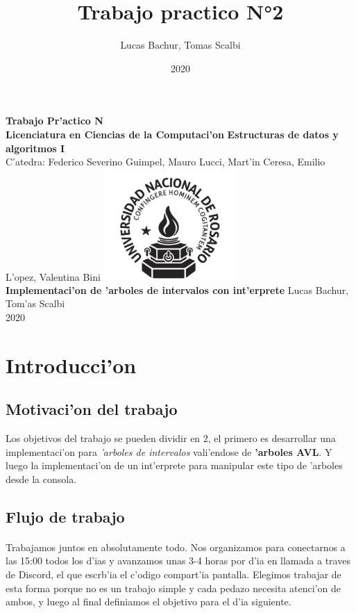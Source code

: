 \documentclass{article}
\title{Trabajo practico N°2}
\author{Lucas Bachur, Tomas Scalbi}
\date{2020}
\begin{document}
	
	\thispagestyle{empty} %
	\begin{center}
		\Huge
		\textbf{Trabajo Pr'actico N}\\
		\LARGE
		\vfill
		\textbf{Licenciatura en Ciencias de la Computaci'on}
		\vfill
		\textbf{Estructuras de datos y algoritmos I} \\
		C'atedra: Federico Severino Guimpel, Mauro Lucci, Mart'in Ceresa, Emilio L'opez, Valentina Bini
		\vfill
		\includegraphics[width=2in]{UNRlogo.png} \\
		\vfill
		\textbf{Implementaci'on de 'arboles de intervalos con int'erprete}
		\vfill
		Lucas Bachur, Tom'as Scalbi \\
		2020 \\
	\end{center}
	\pagebreak
	
	\tableofcontents
	\pagebreak
	
	
	\section{Introducci'on}
		\subsection{Motivaci'on del trabajo}
			Los objetivos del trabajo se pueden dividir en 2, el primero es desarrollar una implementaci'on para \emph{'arboles de intervalos} vali'endose de \textbf{'arboles AVL}.
			Y luego la implementaci'on de un int'erprete para manipular este tipo de 'arboles desde la consola.
			
		\subsection{Flujo de trabajo}
			\paragraph{}
			Trabajamos juntos en absolutamente todo. Nos organizamos para conectarnos a las 15:00 todos los d'ias y avanzamos unas 3-4 horas por d'ia en llamada a traves de Discord, el que escrb'ia el c'odigo compart'ia pantalla. Elegimos trabajar de esta forma porque no es un trabajo simple y cada pedazo necesita atenci'on de ambos, y luego al final definiamos el objetivo para el d'ia siguiente.
\end{document}
